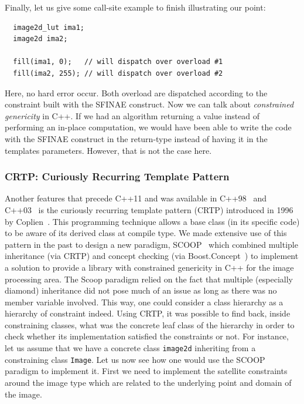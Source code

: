 Finally, let us give some call-site example to finish illustrating our point:

\begin{verbatim}
  image2d_lut ima1;
  image2d ima2;

  fill(ima1, 0);   // will dispatch over overload #1
  fill(ima2, 255); // will dispatch over overload #2
\end{verbatim}
Here, no hard error occur. Both overload are dispatched according to the constraint built with the SFINAE construct. Now
we can talk about \emph{constrained genericity} in C++. If we had an algorithm returning a value instead of performing
an in-place computation, we would have been able to write the code with the SFINAE construct in the return-type instead
of having it in the templates parameters. However, that is not the case here.


\subsubsection{CRTP: Curiously Recurring Template Pattern}
\label{subsec:crtp}

Another features that precede C++11 and was available in C++98~\parencite{iso.1998.cpp} and
C++03~\parencite{iso.2003.cpp} is the curiously recurring template pattern (CRTP) introduced in 1996 by
Coplien~\parencite{coplien.1996.crtp}. This programming technique allows a base class (in its specific code) to be aware
of its derived class at compile type. We made extensive use of this pattern in the past to design a new paradigm,
SCOOP~\parencite{burrus.2003.mpool,geraud.2006.scoop-pres,geraud.2008.mpool,levillain.2011.phd} which combined multiple
inheritance (via CRTP) and concept checking (via Boost.Concept~\parencite{siek.2000.concept,boost.2006.concepts}) to
implement a solution to provide a library with constrained genericity in C++ for the image processing area. The Scoop
paradigm relied on the fact that multiple (especially diamond) inheritance did not pose much of an issue as long as
there was no member variable involved. This way, one could consider a class hierarchy as a hierarchy of constraint
indeed. Using CRTP, it was possible to find back, inside constraining classes, what was the concrete leaf class of the
hierarchy in order to check whether its implementation satisfied the constraints or not. For instance, let us assume
that we have a concrete class \texttt{image2d} inheriting from a constraining class \texttt{Image}. Let us now see how
one would use the SCOOP paradigm to implement it. First we need to implement the satellite constraints around the image
type which are related to the underlying point and domain of the image.


